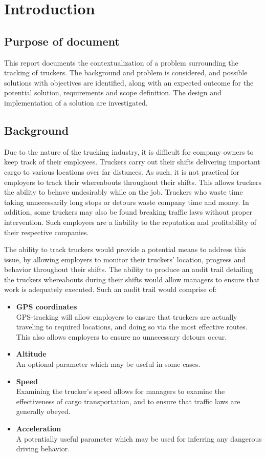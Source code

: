 \section{Introduction}
\subsection{Purpose of document}
This report documents the contextualization of a problem surrounding the tracking of truckers.
The background and problem is considered, and possible solutions with objectives are identified, along with an expected outcome for the potential solution, requirements and scope definition.
The design and implementation of a solution are investigated.

\subsection{Background}
Due to the nature of the trucking industry, it is difficult for company owners to keep track of their employees.
Truckers carry out their shifts delivering important cargo to various locations over far distances.
As such, it is not practical for employers to track their whereabouts throughout their shifts.
This allows truckers the ability to behave undesirably while on the job.
Truckers who waste time taking unnecessarily long stops or detours waste company time and money.
In addition, some truckers may also be found breaking traffic laws without proper intervention.
Such employees are a liability to the reputation and profitability of their respective companies.

The ability to track truckers would provide a potential means to address this issue, by allowing employers to monitor their truckers' location, progress and behavior throughout their shifts.
The ability to produce an audit trail detailing the truckers whereabouts during their shifts would allow managers to ensure that work is adequately executed. Such an audit trail would comprise of:
\begin{itemize}
\item \textbf{GPS coordinates\\}
GPS-tracking will allow employers to ensure that truckers are actually traveling to required locations, and doing so via the most effective routes. This also allows employers to ensure no unnecessary detours occur.
\item \textbf{Altitude\\}
An optional parameter which may be useful in some cases.
\item \textbf{Speed\\}
Examining the trucker's speed allows for managers to examine the effectiveness of cargo transportation, and to ensure that traffic laws are generally obeyed.
\item \textbf{Acceleration\\}
A potentially useful parameter which may be used for inferring any dangerous driving behavior. 
\end{itemize}


